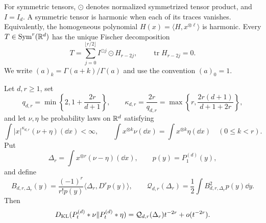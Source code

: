 For symmetric tensors, \(\odot\) denotes normalized symmetrized tensor
product, and \(I=I_d\).  A symmetric tensor is harmonic when each of its
traces vanishes.  Equivalently, the homogeneous polynomial
\(H(x)=\langle H,x^{\otimes \ell}\rangle\) is harmonic.  Every
\(T\in\operatorname{Sym}^r(\mathbb{R}^d)\) has the unique Fischer decomposition
\begin{equation}\label{eq:poisson-tensor-fischer-decomposition}
 T=\sum_{j=0}^{\lfloor r/2\rfloor}I^{\odot j}\odot H_{r-2j},
 \qquad \operatorname{tr}H_{r-2j}=0.
\end{equation}
We write \((a)_k=\Gamma(a+k)/\Gamma(a)\) and use the convention
\((a)_0=1\).

\begin{theorem}
\label{thm:sharp-poisson-harmonic-moment-asymptotic}
Let \(d,r\ge1\), set
\begin{equation}\label{eq:poisson-all-order-critical-exponents}
 q_{d,r}=\min\left\{2,1+\frac{2r}{d+1}\right\},
 \qquad
 \kappa_{d,r}=\frac{2r}{q_{d,r}}
 =\max\left\{r,\frac{2r(d+1)}{d+1+2r}\right\},
\end{equation}
and let \(\nu,\eta\) be probability laws on \(\mathbb{R}^d\) satisfying
\[
 \int|x|^{\kappa_{d,r}}(\nu+\eta)(\dd x)<\infty,
 \qquad
 \int x^{\otimes k}\nu(\dd x)=\int x^{\otimes k}\eta(\dd x)
 \quad(0\le k<r).
\]
Put
\[
 \Delta_r=\int x^{\otimes r}(\nu-\eta)(\dd x),
 \qquad p(y)=P_1^{(d)}(y),
\]
and define
\begin{equation}\label{eq:poisson-all-order-leading-form}
 B_{d,r,\Delta_r}(y)
 =\frac{(-1)^r}{r!p(y)}\langle\Delta_r,D^rp(y)\rangle,
 \qquad
 \mathcal Q_{d,r}(\Delta_r)
 =\frac12\int B_{d,r,\Delta_r}^2p(y)\dd y.
\end{equation}
Then
\begin{equation}\label{eq:sharp-poisson-harmonic-moment-asymptotic}
 D_{\rm KL}(P_t^{(d)}*\nu\|P_t^{(d)}*\eta)
 =\mathcal Q_{d,r}(\Delta_r)t^{-2r}+o(t^{-2r}).
\end{equation}


\end{theorem}
